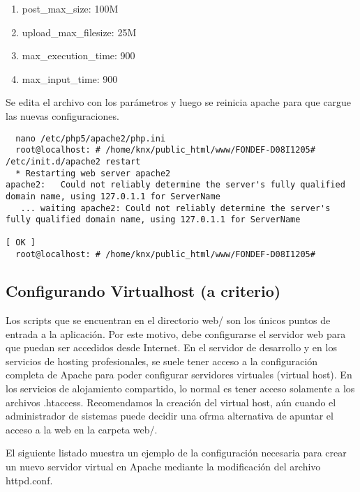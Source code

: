 \begin{enumerate}
 \item post\_max\_size: 100M
 \item upload\_max\_filesize: 25M
 \item max\_execution\_time: 900
 \item max\_input\_time: 900
\end{enumerate}

Se edita el archivo con los par\'ametros y luego se reinicia apache para que cargue las nuevas configuraciones.
\lstset{language=sh}
\begin{lstlisting}
  nano /etc/php5/apache2/php.ini
  root@localhost: # /home/knx/public_html/www/FONDEF-D08I1205# /etc/init.d/apache2 restart
  * Restarting web server apache2                                                                                                                                                             apache2:   Could not reliably determine the server's fully qualified domain name, using 127.0.1.1 for ServerName
   ... waiting apache2: Could not reliably determine the server's fully qualified domain name, using 127.0.1.1 for ServerName
                                                                                                                                                                                    [ OK ]
  root@localhost: # /home/knx/public_html/www/FONDEF-D08I1205#
\end{lstlisting}


\subsection{Configurando Virtualhost (a criterio)}

Los scripts que se encuentran en el directorio web/ son los únicos puntos de entrada a la aplicación. Por este motivo, debe configurarse el servidor web para que puedan ser accedidos desde Internet. En el servidor de desarrollo y en los servicios de hosting profesionales, se suele tener acceso a la configuración completa de Apache para poder configurar servidores virtuales (virtual host). En los servicios de alojamiento compartido, lo normal es tener acceso solamente a los archivos .htaccess. Recomendamos la creaci\'on del virtual host, a\'un cuando el administrador de sistemas puede decidir una ofrma alternativa de apuntar el acceso a la web en la carpeta web/.\newline


El siguiente listado muestra un ejemplo de la configuración necesaria para crear un nuevo servidor virtual en Apache mediante la modificación del archivo httpd.conf.\newline



